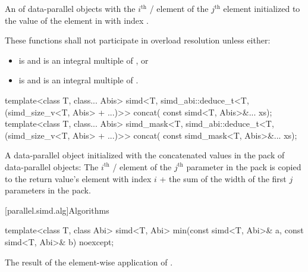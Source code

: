 \begin{itemdescr}
  \pnum\returns
  An  of data-parallel objects with the $i^\text{th}$ / element of the $j^\text{th}$  element initialized to the value of the element in  with index .

  \pnum\remarks
  These functions shall not participate in overload resolution unless either:
  \begin{itemize}
    \item {} is  and  is an integral multiple of , or
    \item {} is  and  is an integral multiple of .
  \end{itemize}
\end{itemdescr}

\begin{itemdecl}
template<class T, class... Abis>
  simd<T, simd_abi::deduce_t<T, (simd_size_v<T, Abis> + ...)>> concat(
    const simd<T, Abis>&... xs);
template<class T, class... Abis>
  simd_mask<T, simd_abi::deduce_t<T, (simd_size_v<T, Abis> + ...)>> concat(
    const simd_mask<T, Abis>&... xs);
\end{itemdecl}

\begin{itemdescr}
  \pnum\returns
  A data-parallel object initialized with the concatenated values in the  pack of data-parallel objects: The $i^\text{th}$ / element of the $j^\text{th}$ parameter in the  pack is copied to the return value's element with index $i$ + the sum of the width of the first $j$ parameters in the  pack.
\end{itemdescr}

[parallel.simd.alg]{Algorithms}

\begin{itemdecl}
template<class T, class Abi> simd<T, Abi> min(const simd<T, Abi>& a, const simd<T, Abi>& b) noexcept;
\end{itemdecl}

\begin{itemdescr}
  \pnum\returns
  The result of the element-wise application of  \foralli.
\end{itemdescr}

